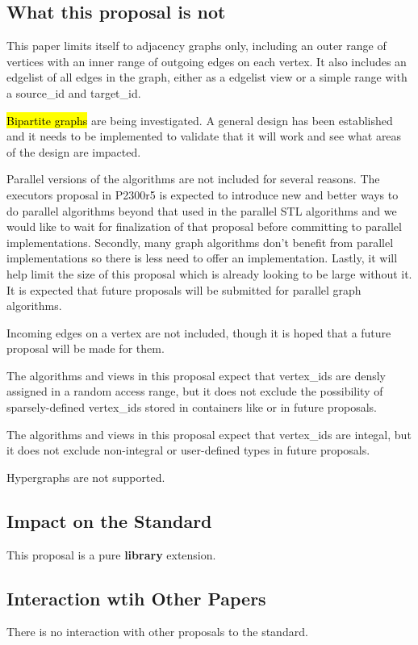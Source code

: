 \subsection{What this proposal is  \textbf{not}}

This paper limits itself to adjacency graphs only, including an outer range of vertices with an inner range of outgoing edges on each vertex. It also includes an edgelist of all edges in the graph, either as a edgelist view or a simple range with a source\_id and target\_id. 

\hl{Bipartite graphs} are being investigated. A general design has been established and it needs to be implemented to validate that it will work and see what areas of the design are impacted.

Parallel versions of the algorithms are not included for several reasons. The executors proposal in P2300r5 \cite{REF_P2300r5} is expected to introduce new and better ways to do parallel algorithms beyond that used in the parallel STL algorithms and we would like to wait for finalization of that proposal before committing to parallel implementations. Secondly, many graph algorithms don't benefit from parallel implementations so there is less need to offer an implementation. Lastly, it will help limit the size of this proposal which is already looking to be large without it. It is expected that future proposals will be submitted for parallel graph algorithms. 

Incoming edges on a vertex are not included, though it is hoped that a future proposal will be made for them.

The algorithms and views in this proposal expect that vertex\_ids are densly assigned in a random access range, but it does not exclude the possibility of sparsely-defined vertex\_ids stored in containers like  or  in future proposals. 

The algorithms and views in this proposal expect that vertex\_ids are integal, but it does not exclude non-integral or user-defined types in future proposals.

Hypergraphs are not supported.

\subsection{Impact on the Standard}
This proposal is a pure \textbf{library} extension.

\subsection{Interaction wtih Other Papers}
There is no interaction with other proposals to the standard.

